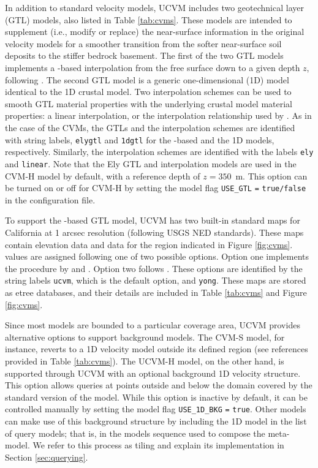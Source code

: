 In addition to standard velocity models, UCVM includes two geotechnical layer (GTL) models, also listed in Table \ref{tab:cvms}. These models are intended to supplement (i.e., modify or replace) the near-surface information in the original velocity models for a smoother transition from the softer near-surface soil deposits to the stiffer bedrock basement. The first of the two GTL models implements a \vsthirty-based interpolation from the free surface down to a given depth $z$, following \citet{Ely_2010_AGU}. The second GTL model is a generic one-dimensional (1D) model identical to the 1D crustal model. Two interpolation schemes can be used to smooth GTL material properties with the underlying crustal model material properties: a linear interpolation, or the interpolation relationship used by \citet{Ely_2010_AGU}. As in the case of the CVMs, the GTLs and the interpolation schemes are identified with string labels, \texttt{elygtl} and \texttt{1dgtl} for the \vsthirty-based and the 1D models, respectively. Similarly, the interpolation schemes are identified with the labels \texttt{ely} and \texttt{linear}. Note that the Ely GTL and interpolation models are used in the CVM-H model by default, with a reference depth of $z=350$~m. This option can be turned on or off for CVM-H by setting the model flag \texttt{USE\_GTL} \texttt{=} \texttt{true/false} in the configuration file.

To support the \vsthirty-based GTL model, UCVM has two built-in standard maps for California at 1 arcsec resolution (following USGS NED standards). These maps contain elevation data and \vsthirty{} data for the region indicated in Figure \ref{fig:cvms}. \vsthirty{} values are assigned following one of two possible options. Option one implements the procedure by \citet{Wills_2006_BSSA} and \citet{Wald_2007_BSSA}. Option two follows \citet{Yong_2012_BSSA}. These options are identified by the string labels \texttt{ucvm}, which is the default option, and \texttt{yong}. These maps are stored as etree databases, and their details are included in Table \ref{tab:cvms} and Figure \ref{fig:cvms}.

Since most models are bounded to a particular coverage area, UCVM provides alternative options to support background models. The CVM-S model, for instance, reverts to a 1D velocity model outside its defined region (see references provided in Table \ref{tab:cvms}). The UCVM-H model, on the other hand, is supported through UCVM with an optional background 1D velocity structure. This option allows queries at points outside and below the domain covered by the standard version of the model. While this option is inactive by default, it can be controlled manually by setting the model flag \texttt{USE\_1D\_BKG} \texttt{=} \texttt{true}. Other models can make use of this background structure by including the 1D model in the list of query models; that is, in the models sequence used to compose the meta-model. We refer to this process as tiling and explain its implementation in Section \ref{sec:querying}.

